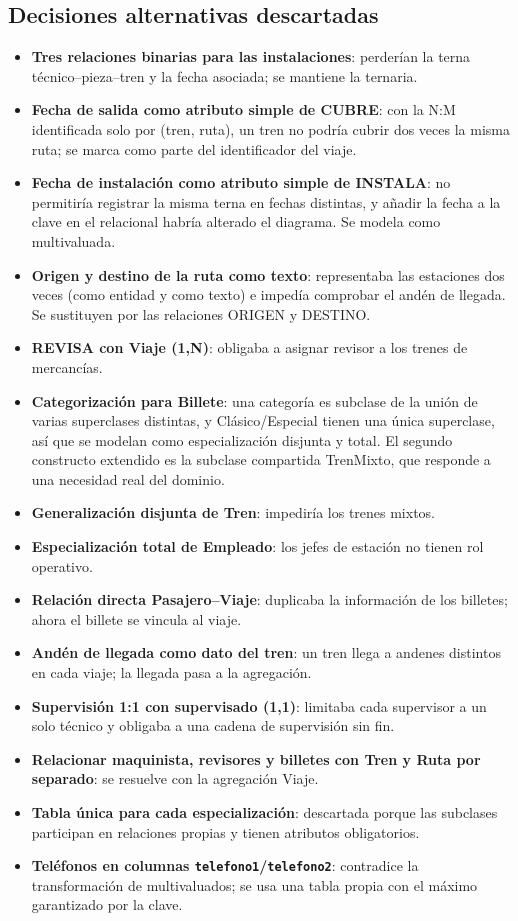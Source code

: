 \documentclass[11pt,a4paper]{article}
\DeclareRobustCommand{\_}{\textunderscore\allowbreak}
\newcommand{\tb}[1]{\texttt{#1}}
\begin{document}
\subsection{Decisiones alternativas descartadas}
\begin{itemize}
\item \textbf{Tres relaciones binarias para las instalaciones}: perderían la terna técnico–pieza–tren y la fecha asociada; se mantiene la ternaria.
\item \textbf{Fecha de salida como atributo simple de CUBRE}: con la N:M identificada solo por (tren, ruta), un tren no podría cubrir dos veces la misma ruta; se marca como parte del identificador del viaje.
\item \textbf{Fecha de instalación como atributo simple de INSTALA}: no permitiría registrar la misma terna en fechas distintas, y añadir la fecha a la clave en el relacional habría alterado el diagrama. Se modela como multivaluada.
\item \textbf{Origen y destino de la ruta como texto}: representaba las estaciones dos veces (como entidad y como texto) e impedía comprobar el andén de llegada. Se sustituyen por las relaciones ORIGEN y DESTINO.
\item \textbf{REVISA con Viaje (1,N)}: obligaba a asignar revisor a los trenes de mercancías.
\item \textbf{Categorización para Billete}: una categoría es subclase de la unión de varias superclases distintas, y Clásico/Especial tienen una única superclase, así que se modelan como especialización disjunta y total. El segundo constructo extendido es la subclase compartida Tren\_Mixto, que responde a una necesidad real del dominio.
\item \textbf{Generalización disjunta de Tren}: impediría los trenes mixtos.
\item \textbf{Especialización total de Empleado}: los jefes de estación no tienen rol operativo.
\item \textbf{Relación directa Pasajero–Viaje}: duplicaba la información de los billetes; ahora el billete se vincula al viaje.
\item \textbf{Andén de llegada como dato del tren}: un tren llega a andenes distintos en cada viaje; la llegada pasa a la agregación.
\item \textbf{Supervisión 1:1 con supervisado (1,1)}: limitaba cada supervisor a un solo técnico y obligaba a una cadena de supervisión sin fin.
\item \textbf{Relacionar maquinista, revisores y billetes con Tren y Ruta por separado}: se resuelve con la agregación Viaje.
\item \textbf{Tabla única para cada especialización}: descartada porque las subclases participan en relaciones propias y tienen atributos obligatorios.
\item \textbf{Teléfonos en columnas \tb{telefono1}/\tb{telefono2}}: contradice la transformación de multivaluados; se usa una tabla propia con el máximo garantizado por la clave.
\end{itemize}
\end{document}

